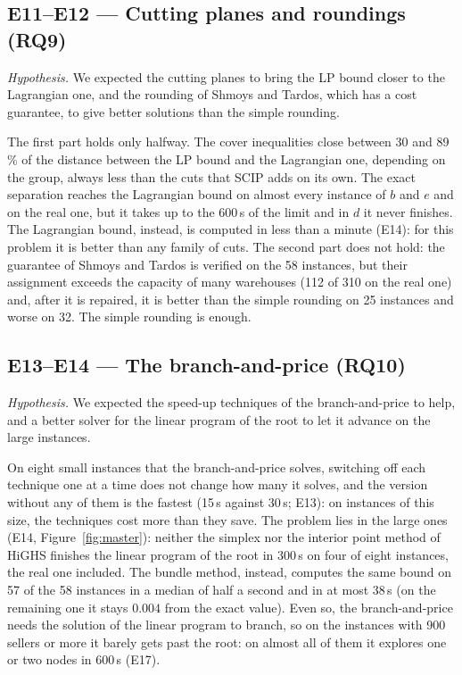 \documentclass[11pt,a4paper]{article}
\begin{document}
\subsection{E11--E12 --- Cutting planes and roundings (RQ9)}
\emph{Hypothesis.} We expected the cutting planes to bring the LP bound closer to the Lagrangian
one, and the rounding of Shmoys and Tardos, which has a cost guarantee, to give better solutions
than the simple rounding.

The first part holds only halfway. The cover inequalities close between 30 and 89\,\% of the
distance between the LP bound and the Lagrangian one, depending on the group, always less than the
cuts that SCIP adds on its own. The exact separation reaches the Lagrangian bound on almost every
instance of $b$ and $e$ and on the real one, but it takes up to the 600\,s of the limit and in $d$
it never finishes. The Lagrangian bound, instead, is computed in less than a minute (E14): for this
problem it is better than any family of cuts. The second part does not hold: the guarantee of
Shmoys and Tardos is verified on the 58 instances, but their assignment exceeds the capacity of
many warehouses (112 of 310 on the real one) and, after it is repaired, it is better than the simple
rounding on 25 instances and worse on 32. The simple rounding is enough.

\subsection{E13--E14 --- The branch-and-price (RQ10)}
\emph{Hypothesis.} We expected the speed-up techniques of the branch-and-price to help, and a better
solver for the linear program of the root to let it advance on the large instances.

On eight small instances that the branch-and-price solves, switching off each technique one at a
time does not change how many it solves, and the version without any of them is the fastest
(15\,s against 30\,s; E13): on instances of this size, the techniques cost more than they save.
The problem lies in the large ones (E14, Figure~\ref{fig:master}): neither the simplex nor the
interior point method of HiGHS finishes the linear program of the root in 300\,s on four of eight
instances, the real one included. The bundle method, instead, computes the same bound on 57 of the
58 instances in a median of half a second and in at most 38\,s (on the remaining one it stays
$0.004$ from the exact value). Even so, the branch-and-price needs the solution of the linear
program to branch, so on the instances with 900 sellers or more it barely gets past the root: on
almost all of them it explores one or two nodes in 600\,s (E17).
\end{document}

